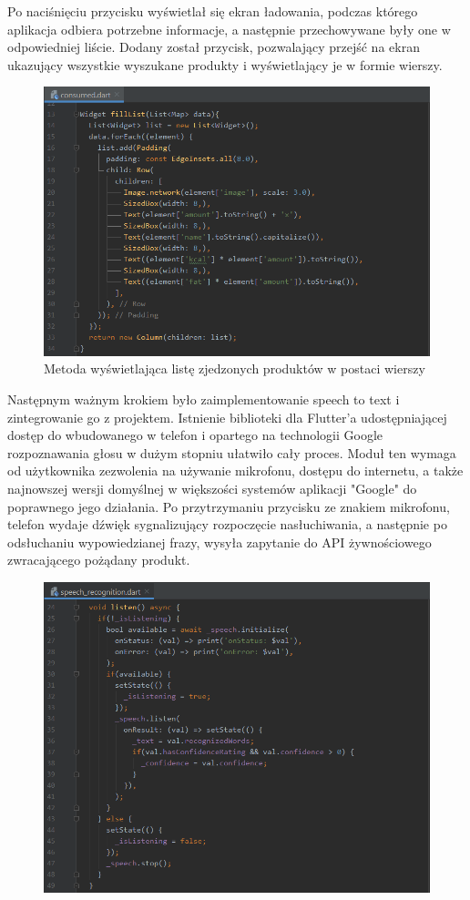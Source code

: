 \documentclass[12pt, a4paper]{article}
\begin{document}
\begin{sloppypar}
{\begin{figure}[H]
    \label{fig:app2}
  \end{figure}
  Po naciśnięciu przycisku wyświetlał się ekran ładowania, podczas którego aplikacja odbiera
  potrzebne informacje, a następnie przechowywane były one w odpowiedniej liście.
  Dodany został przycisk, pozwalający przejść na ekran ukazujący wszystkie wyszukane
  produkty i wyświetlający je w formie wierszy.
  \begin{figure}[H]
    \centering
    \includegraphics[width=.9\textwidth]{app_dev_3.PNG}
    \caption{Metoda wyświetlająca listę zjedzonych produktów w postaci wierszy}
    \label{fig:app3}
  \end{figure}
  Następnym ważnym krokiem było zaimplementowanie speech to text i zintegrowanie go z
  projektem. Istnienie biblioteki dla Flutter'a udostępniającej dostęp do wbudowanego w
  telefon i opartego na technologii Google rozpoznawania głosu w dużym stopniu ułatwiło
  cały proces. Moduł ten wymaga od użytkownika zezwolenia na używanie mikrofonu, dostępu do
  internetu, a także najnowszej wersji domyślnej w większości systemów aplikacji "Google"
  do poprawnego jego działania. Po przytrzymaniu przycisku ze znakiem mikrofonu, telefon
  wydaje dźwięk sygnalizujący rozpoczęcie nasłuchiwania, a następnie po odsłuchaniu
  wypowiedzianej frazy, wysyła zapytanie do API żywnościowego zwracającego pożądany produkt.
  \begin{figure}[H]
    \centering
    \includegraphics[width=.9\textwidth]{app_dev_4.PNG}

\end{figure}}
\end{sloppypar}
\end{document}
